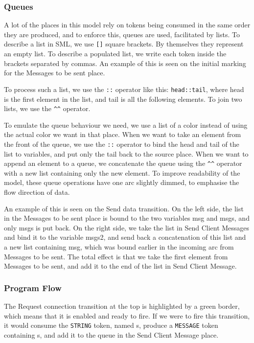	\subsubsection{Queues}
	
		A lot of the places in this model rely on tokens being consumed in the same
		order they are produced, and to enforce this, queues are used, facilitated
		by lists. To describe a list in SML, we use \lstinline:[]: square brackets. By
		themselves they represent an empty list. To describe a populated list, we
		write each token inside the brackets separated by commas. An example of this
		is seen on the initial marking for the Messages to be sent place.
		
		To process such a list, we use the \lstinline-::- operator like this:
		\lstinline-head::tail-, where head is the first element in the list, and tail
		is all the following elements. To join two lists, we use the
		\lstinline:^^: operator. 
		
		To emulate the queue behaviour we need, we use a list of a color instead of
		using the actual color we want in that place. When we want to take an
		element from the front of the queue, we use the \lstinline-::- operator to
		bind the head and tail of the list to variables, and put only the tail back to
		the source place. When we want to append an element to a queue, we concatenate
		the queue using the \lstinline:^^: operator with a new list containing only
		the new element. To improve readability of the model, these queue operations
		have one arc slightly dimmed, to emphasise the flow direction of data.
		
		An example of this is seen on the Send data transition. On the left side, the
		list in the Messages to be sent place is bound to the two variables msg and
		msgs, and only msgs is put back. On the right side, we take the list in Send
		Client Messages and bind it to the variable msgs2, and send back a
		concatenation of this list and a new list containing msg, which was bound
		earlier in the incoming arc from Messages to be sent. The total effect is that
		we take the first element from Messages to be sent, and add it to the end of
		the list in Send Client Message.

	\subsubsection{Program Flow}
	
		The Request connection transition at the top is highlighted by a green border,
		which means that it is enabled and ready to fire. If we were to fire this transition,
		it would consume the \lstinline:STRING: token, named s, produce a
		\lstinline:MESSAGE: token containing s, and add it to the queue in the Send
		Client Message place.
		
